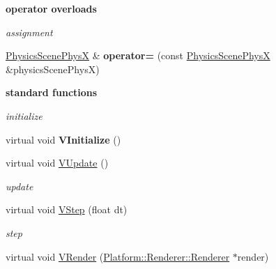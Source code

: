 \begin{Indent}{\bf operator overloads}\par
{\em \label{_amgrp2b6b4abd74032bbca52fca7f70100c25}
 assignment }\begin{DoxyCompactItemize}
\item 
\hypertarget{classContent_1_1Physics_1_1PhysicsScenePhysX_aef6108fd72fbe183422fff00da87926b}{
\hyperlink{classContent_1_1Physics_1_1PhysicsScenePhysX}{PhysicsScenePhysX} \& {\bfseries operator=} (const \hyperlink{classContent_1_1Physics_1_1PhysicsScenePhysX}{PhysicsScenePhysX} \&physicsScenePhysX)}
\label{classContent_1_1Physics_1_1PhysicsScenePhysX_aef6108fd72fbe183422fff00da87926b}

\end{DoxyCompactItemize}
\end{Indent}
\begin{Indent}{\bf standard functions}\par
{\em \label{_amgrp57f1c50bd31a278c7d9f58b3e669c84c}
 initialize }\begin{DoxyCompactItemize}
\item 
\hypertarget{classContent_1_1Physics_1_1PhysicsScenePhysX_aec3a0da18bfc772f0c5635e02f3c6180}{
virtual void {\bfseries VInitialize} ()}
\label{classContent_1_1Physics_1_1PhysicsScenePhysX_aec3a0da18bfc772f0c5635e02f3c6180}

\item 
\hypertarget{classContent_1_1Physics_1_1PhysicsScenePhysX_a4ff050c793fffbfd43e5f20d699abb05}{
virtual void \hyperlink{classContent_1_1Physics_1_1PhysicsScenePhysX_a4ff050c793fffbfd43e5f20d699abb05}{VUpdate} ()}
\label{classContent_1_1Physics_1_1PhysicsScenePhysX_a4ff050c793fffbfd43e5f20d699abb05}

\begin{DoxyCompactList}\small\item\em update \item\end{DoxyCompactList}\item 
\hypertarget{classContent_1_1Physics_1_1PhysicsScenePhysX_a7a991286c44c2eb59f89a167febe6067}{
virtual void \hyperlink{classContent_1_1Physics_1_1PhysicsScenePhysX_a7a991286c44c2eb59f89a167febe6067}{VStep} (float dt)}
\label{classContent_1_1Physics_1_1PhysicsScenePhysX_a7a991286c44c2eb59f89a167febe6067}

\begin{DoxyCompactList}\small\item\em step \item\end{DoxyCompactList}\item 
\hypertarget{classContent_1_1Physics_1_1PhysicsScenePhysX_ab95d94fc6adad762bf6b87b95e2c2dbe}{
virtual void \hyperlink{classContent_1_1Physics_1_1PhysicsScenePhysX_ab95d94fc6adad762bf6b87b95e2c2dbe}{VRender} (\hyperlink{classPlatform_1_1Renderer_1_1Renderer}{Platform::Renderer::Renderer} $\ast$render)}
\label{classContent_1_1Physics_1_1PhysicsScenePhysX_ab95d94fc6adad762bf6b87b95e2c2dbe}


\end{DoxyCompactItemize}
\end{Indent}

